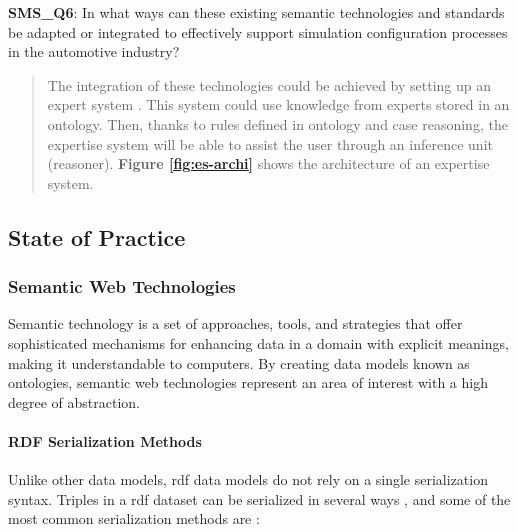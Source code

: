             \textbf{SMS\_Q6}: In what ways can these existing semantic technologies and standards be adapted or integrated to effectively support simulation configuration processes in the automotive industry?
            \begin{quote}
                The integration of these technologies could be achieved by setting up an expert system \cite{happel2006applications}. This system could use knowledge from experts stored in an ontology. Then, thanks to rules defined in ontology and case reasoning, the expertise system will be able to assist the user through an inference unit (reasoner).  \textbf{Figure \ref{fig:es-archi}} shows the architecture of an expertise system.\\
            \end{quote}
        
    \subsection{State of Practice}
        \subsubsection{Semantic Web Technologies\label{sec:semtec}}
        Semantic technology is a set of approaches, tools, and strategies that offer sophisticated mechanisms for enhancing data in a domain with explicit meanings, making it understandable to computers. By creating data models known as ontologies, semantic web technologies represent an area of interest with a high degree of abstraction.\\ 
        
            \paragraph{RDF Serialization Methods}
                Unlike other data models, \acrshort{rdf} data models do not rely on a single serialization syntax. Triples in a \acrshort{rdf} dataset can be serialized in several ways \cite{martinez2012exchange}, and some of the most common serialization methods are : 

